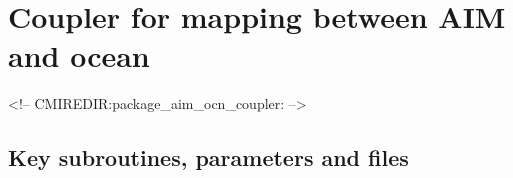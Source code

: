 \section{Coupler for mapping between AIM and ocean }
\label{sec:pkg:aim_ocn_coupler}
\begin{rawhtml}
<!-- CMIREDIR:package_aim_ocn_coupler: -->
\end{rawhtml}

\subsection{Key subroutines, parameters and files}
\label{sec:pkg:aim_ocn_coupler:implementation_synopsis}
